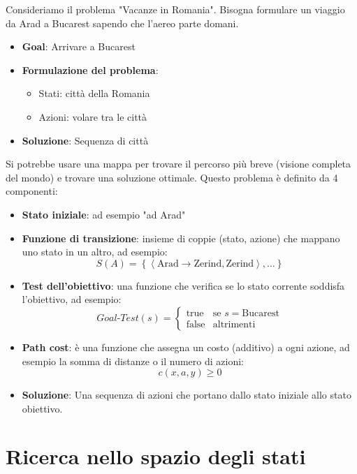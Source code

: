 \documentclass[a4paper]{article}
\begin{document}
\begin{example}
  Consideriamo il problema "Vacanze in Romania". Bisogna formulare un viaggio da Arad a
  Bucarest sapendo che l'aereo parte domani.
  \begin{itemize}
    \item \textbf{Goal}: Arrivare a Bucarest
    \item \textbf{Formulazione del problema}:
      \begin{itemize}
        \item Stati: città della Romania
        \item Azioni: volare tra le città
      \end{itemize}
    \item \textbf{Soluzione}: Sequenza di città
  \end{itemize}
  \noindent
  Si potrebbe usare una mappa per trovare il percorso più breve (visione completa del mondo)
  e trovare una soluzione ottimale.
  Questo problema è definito da 4 componenti:
  \begin{itemize}
    \item \textbf{Stato iniziale}: ad esempio "ad Arad"
    \item \textbf{Funzione di transizione}: insieme di coppie (stato, azione) che mappano
      uno stato in un altro, ad esempio:
      \[
        S(A) = \left\{ \left< \text{Arad} \to \text{Zerind}, \text{Zerind} \right>, \ldots \right\}
      \] 
    \item \textbf{Test dell'obiettivo}: una funzione che verifica se lo stato corrente
      soddisfa l'obiettivo, ad esempio:
      \[
        Goal\text{-}Test(s) = \begin{cases}
          \text{true} & \text{se } s = \text{Bucarest} \\
          \text{false} & \text{altrimenti}
        \end{cases}
      \]
    \item \textbf{Path cost}: è una funzione che assegna un costo (additivo) a ogni azione,
      ad esempio la somma di distanze o il numero di azioni:
      \[
        c(x, a, y) \ge 0
      \] 
    \item \textbf{Soluzione}: Una sequenza di azioni che portano dallo stato iniziale allo
      stato obiettivo.
  \end{itemize}
\end{example}

\section{Ricerca nello spazio degli stati}
\end{document}
